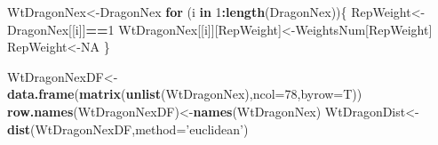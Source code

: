 \documentclass[
]{article}
\newenvironment{Shaded}{\begin{snugshade}}{\end{snugshade}}
\newcommand{\ControlFlowTok}[1]{\textcolor[rgb]{0.13,0.29,0.53}{\textbf{#1}}}
\newcommand{\DataTypeTok}[1]{\textcolor[rgb]{0.13,0.29,0.53}{#1}}
\newcommand{\DecValTok}[1]{\textcolor[rgb]{0.00,0.00,0.81}{#1}}
\newcommand{\KeywordTok}[1]{\textcolor[rgb]{0.13,0.29,0.53}{\textbf{#1}}}
\newcommand{\NormalTok}[1]{#1}
\newcommand{\OperatorTok}[1]{\textcolor[rgb]{0.81,0.36,0.00}{\textbf{#1}}}
\newcommand{\OtherTok}[1]{\textcolor[rgb]{0.56,0.35,0.01}{#1}}
\newcommand{\StringTok}[1]{\textcolor[rgb]{0.31,0.60,0.02}{#1}}
\begin{document}
\begin{Shaded}
\end{Shaded}

\begin{Shaded}
\end{Shaded}

\begin{Shaded}
\begin{Highlighting}[]
\NormalTok{WtDragonNex<-DragonNex }
\ControlFlowTok{for}\NormalTok{ (i }\ControlFlowTok{in} \DecValTok{1}\OperatorTok{:}\KeywordTok{length}\NormalTok{(DragonNex))\{}
\NormalTok{  RepWeight<-DragonNex[[i]]}\OperatorTok{==}\DecValTok{1}
\NormalTok{  WtDragonNex[[i]][RepWeight]<-WeightsNum[RepWeight]}
\NormalTok{  RepWeight<-}\OtherTok{NA}
\NormalTok{\}}
\end{Highlighting}
\end{Shaded}

\begin{Shaded}
\begin{Highlighting}[]
\NormalTok{WtDragonNexDF<-}\KeywordTok{data.frame}\NormalTok{(}\KeywordTok{matrix}\NormalTok{(}\KeywordTok{unlist}\NormalTok{(WtDragonNex),}\DataTypeTok{ncol=}\DecValTok{78}\NormalTok{,}\DataTypeTok{byrow=}\NormalTok{T))}
\KeywordTok{row.names}\NormalTok{(WtDragonNexDF)<-}\KeywordTok{names}\NormalTok{(WtDragonNex)}
\NormalTok{WtDragonDist<-}\KeywordTok{dist}\NormalTok{(WtDragonNexDF,}\DataTypeTok{method=}\StringTok{'euclidean'}\NormalTok{)}
\end{Highlighting}
\end{Shaded}
\end{document}
